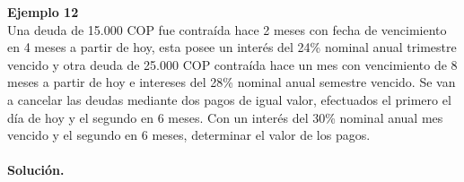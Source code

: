 \textbf{Ejemplo 12}\\
Una deuda de 15.000 COP fue contraída hace 2 meses con fecha de vencimiento en 4
meses a partir de hoy, esta posee un interés del 24\% nominal anual trimestre vencido y
otra deuda de 25.000 COP contraída hace un mes con vencimiento de 8 meses a partir de hoy
e intereses del 28\% nominal anual semestre vencido. Se van a cancelar las deudas
mediante dos pagos de igual valor, efectuados el primero el día de hoy y el segundo en 6
meses. Con un interés del 30\% nominal anual mes vencido y el segundo en 6 meses,
determinar el valor de los pagos.\\ \\
\textbf{Solución.}\\
